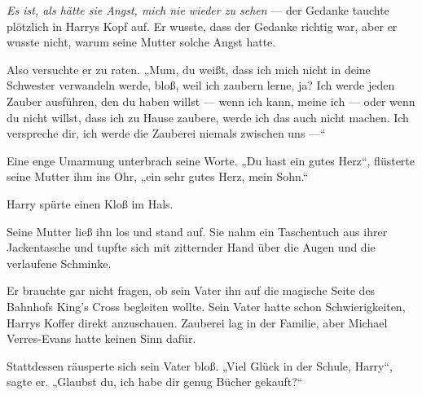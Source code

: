 \emph{Es ist, als hätte sie Angst, mich nie wieder zu sehen} — der Gedanke tauchte plötzlich in Harrys Kopf auf. Er wusste, dass der Gedanke richtig war, aber er wusste nicht, warum seine Mutter solche Angst hatte.

Also versuchte er zu raten.
„Mum, du weißt, dass ich mich nicht in deine Schwester verwandeln werde, bloß, weil ich zaubern lerne, ja? Ich werde jeden Zauber ausführen, den du haben willst — wenn ich kann, meine ich — oder wenn du nicht willst, dass ich zu Hause zaubere, werde ich das auch nicht machen. Ich verspreche dir, ich werde die Zauberei niemals zwischen uns —“

Eine enge Umarmung unterbrach seine Worte.
„Du hast ein gutes Herz“, flüsterte seine Mutter ihm ins Ohr, „ein sehr gutes Herz, mein Sohn.“

Harry spürte einen Kloß im Hals.

Seine Mutter ließ ihn los und stand auf. Sie nahm ein Taschentuch aus ihrer Jackentasche und tupfte sich mit zitternder Hand über die Augen und die verlaufene Schminke.

Er brauchte gar nicht fragen, ob sein Vater ihn auf die magische Seite des Bahnhofs King’s Cross begleiten wollte. Sein Vater hatte schon Schwierigkeiten, Harrys Koffer direkt anzuschauen. Zauberei lag in der Familie, aber Michael Verres-Evans hatte keinen Sinn dafür.

Stattdessen räusperte sich sein Vater bloß.
„Viel Glück in der Schule, Harry“, sagte er.
„Glaubst du, ich habe dir genug Bücher gekauft?“

